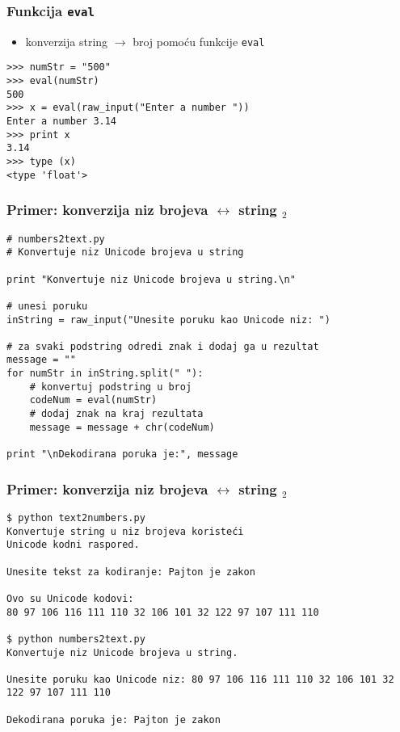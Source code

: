 \documentclass[utf8,compress]{beamer}
\begin{document}
\begin{frame}[fragile]
  \frametitle{Funkcija \texttt{eval}}
  \begin{itemize}
    \item konverzija string $\rightarrow$ broj pomoću funkcije \texttt{eval}
  \end{itemize}
\begin{verbatim}
>>> numStr = "500"
>>> eval(numStr)
500
>>> x = eval(raw_input("Enter a number "))
Enter a number 3.14
>>> print x
3.14
>>> type (x)
<type 'float'>
\end{verbatim}
\end{frame}

\begin{frame}[fragile,shrink=10]
  \frametitle{Primer: konverzija niz brojeva $\leftrightarrow$ string $_2$}
\begin{verbatim}
# numbers2text.py
# Konvertuje niz Unicode brojeva u string

print "Konvertuje niz Unicode brojeva u string.\n"

# unesi poruku
inString = raw_input("Unesite poruku kao Unicode niz: ")

# za svaki podstring odredi znak i dodaj ga u rezultat
message = ""
for numStr in inString.split(" "):
    # konvertuj podstring u broj
    codeNum = eval(numStr)
    # dodaj znak na kraj rezultata
    message = message + chr(codeNum) 

print "\nDekodirana poruka je:", message
\end{verbatim}
\end{frame}

\begin{frame}[fragile,shrink=10]
  \frametitle{Primer: konverzija niz brojeva $\leftrightarrow$ string $_2$}
\begin{verbatim}
$ python text2numbers.py
Konvertuje string u niz brojeva koristeći
Unicode kodni raspored.

Unesite tekst za kodiranje: Pajton je zakon

Ovo su Unicode kodovi:
80 97 106 116 111 110 32 106 101 32 122 97 107 111 110

$ python numbers2text.py
Konvertuje niz Unicode brojeva u string.

Unesite poruku kao Unicode niz: 80 97 106 116 111 110 32 106 101 32 122 97 107 111 110

Dekodirana poruka je: Pajton je zakon
\end{verbatim}
\end{frame}
\end{document}
